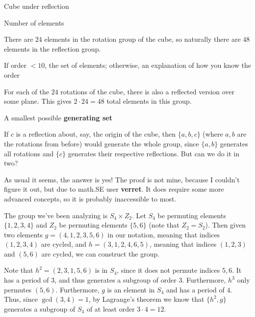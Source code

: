 \documentclass[../gatm_answers.tex]{subfiles}
\begin{document}
\begin{outer_problem}
\item Cube under reflection
\end{outer_problem}

\begin{inner_problem}[start=1]
\item Number of elements
\end{inner_problem}

\noindent There are $24$ elements in the rotation group of the cube, so naturally there are $48$ elements in the reflection group.

\begin{inner_problem}
\item If order $< 10$, the set of elements; otherwise, an explanation of how you know the order
\end{inner_problem}

\noindent For each of the $24$ rotations of the cube, there is also a reflected version over some plane. This gives $2\cdot 24=48$ total elements in this group.

\begin{inner_problem}
\item A smallest possible \textbf{generating set}
\end{inner_problem}

\noindent If $c$ is a reflection about, say, the origin of the cube, then $\{a,b,c\}$ (where $a,b$ are the rotations from before) would generate the whole group, since $\{a,b\}$ generates all rotations and $\{c\}$ generates their respective reflections. But can we do it in two?

As usual it seems, the answer is yes! The proof is not mine, because I couldn't figure it out, but due to math.SE user \textbf{verret}. It does require some more advanced concepts, so it is probably inaccessible to most.

The group we've been analyzing is $S_4\times Z_2$. Let $S_4$ be permuting elements $\{1,2,3,4\}$ and $Z_2$ be permuting elements $\{5,6\}$ (note that $Z_2=S_2$). Then given two elements $g=(4,1,2,3,5,6)$ in our notation, meaning that indices $(1,2,3,4)$ are cycled, and $h=(3,1,2,4,6,5)$, meaning that indices $(1,2,3)$ and $(5,6)$ are cycled, we can construct the group.

Note that $h^2=(2,3,1,5,6)$ is in $S_4$, since it does not permute indices $5,6$. It has a period of $3$, and thus generates a subgroup of order $3$. Furthermore, $h^3$ only permutes $(5,6)$. Furthermore, $g$ is an element in $S_4$ and has a period of $4$. Thus, since $\gcd(3,4)=1$, by Lagrange's theorem we know that $\{h^2,g\}$ generates a subgroup of $S_4$ of at least order $3\cdot 4=12$.
\end{document}
